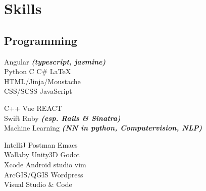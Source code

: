 \documentclass[a4paper]{deedy-resume_twopage} %
\begin{document}
\begin{minipage}[t]{0.25\textwidth}

  \sectionspace
  \section{Skills}

  \subsection{Programming}
  \textbullet{} Angular {\footnotesize \textit{\textbf{(typescript, jasmine)}}} \\
  \textbullet{} Python
  \textbullet{} C  \textbullet{} C\# \textbullet{} \LaTeX\ \\
  \textbullet{} HTML/Jinja/Moustache \\
  \textbullet{} CSS/SCSS %
   \textbullet{} JavaScript %

  \sectionspace

  \textbullet{} C++ \textbullet{} Vue \textbullet{} REACT \\
  \textbullet{} Swift \textbullet{}  Ruby {\footnotesize \textit{\textbf{(esp. Rails \& Sinatra)}}} \\
  \textbullet{} Machine Learning {\footnotesize \textit{\textbf{(NN in python, Computervision, NLP)}}}

  \sectionspace

  \textbullet{} IntelliJ \textbullet{} Postman \textbullet{} Emacs \\
  \textbullet{} Wallaby
  \textbullet{} Unity3D \textbullet{} Godot \\
  \textbullet{} Xcode \textbullet{} Android studio \textbullet{} vim \\
  \textbullet{} ArcGIS/QGIS \textbullet{} Wordpress \\
  \textbullet{} Visual Studio \& Code \\


\end{minipage}
\end{document}
